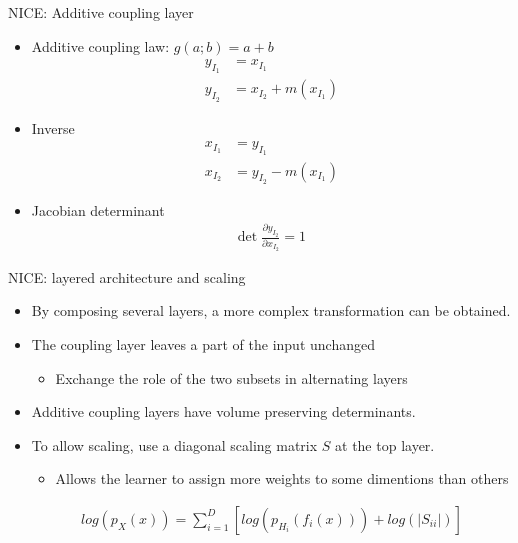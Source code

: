 \begin{frame}{NICE: Additive coupling layer}
\begin{itemize}
    \item Additive coupling law: $g(a; b) = a + b$
    \begin{align*}
                y_{I_1} &= x_{I_1} \\
                y_{I_2} &= x_{I_2} + m(x_{I_1})
    \end{align*}
    \item Inverse
    \begin{align*}
                x_{I_1} &= y_{I_1} \\
                x_{I_2} &= y_{I_2} - m(x_{I_1})
    \end{align*}
    \item Jacobian determinant
    \begin{align*}
        \text{det} \; \frac{\partial y_{I_2}}{\partial x_{I_2}} = 1
    \end{align*}
\end{itemize}
\end{frame}
\begin{frame}{NICE: layered architecture and scaling}
    \begin{itemize}
        \item By composing several layers, a more complex transformation can be obtained.
        \item The coupling layer leaves a part of the input unchanged
        \begin{itemize}
            \item Exchange the role of the two subsets in alternating layers
        \end{itemize}
        \item Additive coupling layers have volume preserving determinants.
        \item To allow scaling, use a diagonal scaling matrix $S$ at the top layer.
        \begin{itemize}
            \item Allows the learner to assign more weights to some dimentions than others
        \end{itemize}
        \begin{align*}
            log(p_X(x)) = \sum_{i=1}^D[log(p_{H_i}(f_i(x)))+log(|S_{ii}|)]
        \end{align*}
    \end{itemize}
\end{frame}
